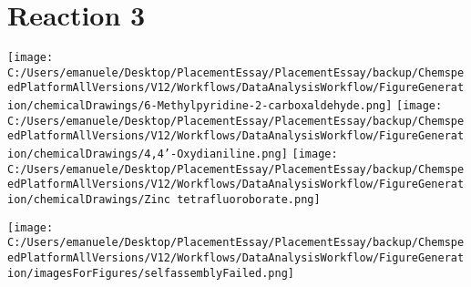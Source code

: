 \documentclass{article}%
\begin{document}
\section*{Reaction 3}%
%
\begin{scheme}[H]%
\begin{minipage}{0.5\textwidth}%
\texttt{[image: C:/Users/emanuele/Desktop/PlacementEssay/PlacementEssay/backup/ChemspeedPlatformAllVersions/V12/Workflows/DataAnalysisWorkflow/FigureGeneration/chemicalDrawings/6-Methylpyridine-2-carboxaldehyde.png]}%
\texttt{[image: C:/Users/emanuele/Desktop/PlacementEssay/PlacementEssay/backup/ChemspeedPlatformAllVersions/V12/Workflows/DataAnalysisWorkflow/FigureGeneration/chemicalDrawings/4,4'-Oxydianiline.png]}%
\texttt{[image: C:/Users/emanuele/Desktop/PlacementEssay/PlacementEssay/backup/ChemspeedPlatformAllVersions/V12/Workflows/DataAnalysisWorkflow/FigureGeneration/chemicalDrawings/Zinc tetrafluoroborate.png]}%
\end{minipage}%
\begin{minipage}{0.5\textwidth}%
\begin{center}%
\texttt{[image: C:/Users/emanuele/Desktop/PlacementEssay/PlacementEssay/backup/ChemspeedPlatformAllVersions/V12/Workflows/DataAnalysisWorkflow/FigureGeneration/imagesForFigures/selfassemblyFailed.png]}%
\end{center}%
\end{minipage}%
\caption{Self-assembly of components 8, 15, with Zinc(II) in a 3.0:1.5:1.0 molar ratio in CH$_3$CN at 60\textdegree C for 40h. These are the reagents (starting materials) for reaction 3.}%
\end{scheme}%
\end{document}
